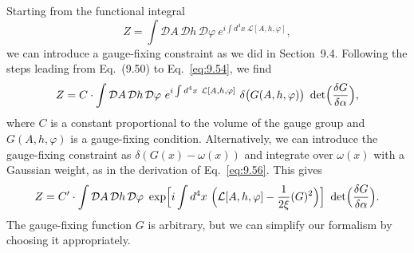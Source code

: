 Starting from the functional integral
\begin{equation}
  Z = \int \mathcal{D}A\,\mathcal{D}h\,\mathcal{D}\varphi\ e^{i\int
    d^4x\ \mathcal{L}[A,h,\varphi]} ,
  \label{eq:21.8}
\end{equation}
we can introduce a gauge-fixing constraint as we did in Section~9.4.
Following the steps leading from Eq.~(9.50) to Eq.~\eqref{eq:9.54},
we find
\begin{equation}
  Z = C\cdot \int \mathcal{D}A\,\mathcal{D}h\,\mathcal{D}\varphi\ e^{i\int
    d^4x\ \mathcal{L}[A,h,\varphi]}\ \delta\bigl( G(A,h,\varphi) \bigr)\
    \det\Bigl( \frac{\delta G}{\delta\alpha} \Bigr) ,
  \label{eq:21.9}
\end{equation}
where $C$ is a constant proportional to the volume of the gauge group and
$G(A,h,\varphi)$ is a gauge-fixing condition.  Alternatively, we can introduce
the gauge-fixing constraint as $\delta(G(x) - \omega(x))$ and integrate over
$\omega(x)$ with a Gaussian weight, as in the derivation of Eq.~\eqref{eq:9.56}.
This gives
\begin{equation}
  Z = C'\cdot \int \mathcal{D}A\,\mathcal{D}h\,\mathcal{D}\varphi\ \exp\Bigl[
    i\int d^4x\ \Bigl( \mathcal{L}[A,h,\varphi] - \frac{1}{2\xi}(G)^2
      \Bigr) \Bigr]\ \det\Bigl( \frac{\delta G}{\delta\alpha} \Bigr) .
  \label{eq:21.10}
\end{equation}
The gauge-fixing function $G$ is arbitrary, but we can simplify our formalism
by choosing it appropriately.

